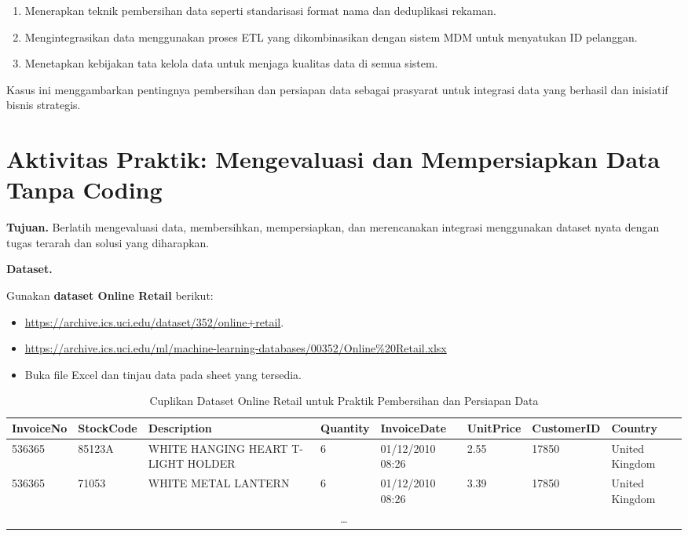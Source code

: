\begin{enumerate}
	\item Menerapkan teknik pembersihan data seperti standarisasi format nama dan deduplikasi rekaman.
	\item Mengintegrasikan data menggunakan proses ETL yang dikombinasikan dengan sistem MDM untuk menyatukan ID pelanggan.
	\item Menetapkan kebijakan tata kelola data untuk menjaga kualitas data di semua sistem.
\end{enumerate}

Kasus ini menggambarkan pentingnya pembersihan dan persiapan data sebagai prasyarat untuk integrasi data yang berhasil dan inisiatif bisnis strategis.

\section{Aktivitas Praktik: Mengevaluasi dan Mempersiapkan Data Tanpa Coding}

\textbf{Tujuan.}  
Berlatih mengevaluasi data, membersihkan, mempersiapkan, dan merencanakan integrasi menggunakan dataset nyata dengan tugas terarah dan solusi yang diharapkan.

\textbf{Dataset.}

Gunakan \textbf{dataset Online Retail} berikut:

\begin{itemize}
		\item \url{https://archive.ics.uci.edu/dataset/352/online+retail}.
	\item \url{https://archive.ics.uci.edu/ml/machine-learning-databases/00352/Online%20Retail.xlsx} 
	\item Buka file Excel dan tinjau data pada sheet yang tersedia.
\end{itemize}

\begin{table}[h]
	\centering
	\scriptsize
	\renewcommand{\arraystretch}{1.2}
			\caption{Cuplikan Dataset Online Retail untuk Praktik Pembersihan dan Persiapan Data}
	\begin{tabular}{|p{}|p{}|p{}|p{}|p{}|p{}|p{}|p{}|}
		\hline
		\textbf{InvoiceNo} & \textbf{StockCode} & \textbf{Description} & \textbf{Quantity} & \textbf{InvoiceDate} & \textbf{UnitPrice} & \textbf{CustomerID} & \textbf{Country} \\
		\hline
		536365 & 85123A & WHITE HANGING HEART T-LIGHT HOLDER & 6 & 01/12/2010 08:26 & 2.55 & 17850 & United Kingdom \\
		\hline
		536365 & 71053 & WHITE METAL LANTERN & 6 & 01/12/2010 08:26 & 3.39 & 17850 & United Kingdom \\
		\hline
		\multicolumn{8}{c}{\ldots} \\
		\hline
	\end{tabular}

	\label{tab:online-retail-snippet}
\end{table}


